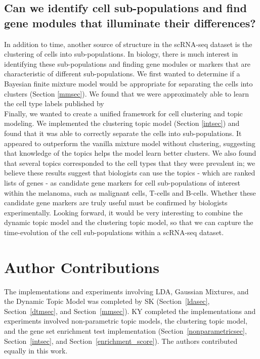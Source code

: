 \documentclass{article}
\begin{document}
\subsection{Can we identify cell sub-populations and find gene modules that illuminate their differences?}
In addition to time, another source of structure in the scRNA-seq dataset is the clustering of cells into sub-populations. In biology, there is much interest in identifying these sub-populations and finding gene modules or markers that are characteristic of different sub-populations. We first wanted to determine if a Bayesian finite mixture model would be appropriate for separating the cells into clusters (Section \ref{mmsec}). We found that we were approximately able to learn the cell type labels published by \cite{melanoma}\\

Finally, we wanted to create a unified framework for cell clustering and topic modeling. We implemented the clustering topic model (Section \ref{intsec}) and found that it was able to correctly separate the cells into sub-populations. It appeared to outperform the vanilla mixture model without clustering, suggesting that knowledge of the topics helps the model learn better clusters. We also found that several topics corresponded to the cell types that they were prevalent in; we believe these results suggest that biologists can use the topics - which are ranked lists of genes - as candidate gene markers for cell sub-populations of interest within the melanoma, such as malignant cells, T-cells and B-cells. Whether these candidate gene markers are truly useful must be confirmed by biologists experimentally. Looking forward, it would be very interesting to combine the dynamic topic model and the clustering topic model, so that we can capture the time-evolution of the cell sub-populations within a scRNA-seq dataset. 


\section{Author Contributions}
The implementations and experiments involving LDA, Gaussian Mixtures, and the Dynamic Topic Model was completed by SK (Section~\ref{ldasec}, Section~\ref{dtmsec}, and Section~\ref{mmsec}). KY completed the implementations and experiments involved non-parametric topic models, the clustering topic model, and the gene set enrichment test implementation (Section~\ref{nonparametricsec}, Section~\ref{intsec}, and Section~\ref{enrichment_score}). The authors contributed equally in this work.
\end{document}
